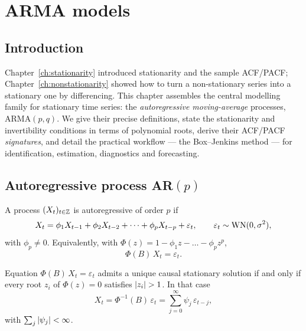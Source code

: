 
\chapter{ARMA models}
\label{ch:arma}

\section*{Introduction}

Chapter~\ref{ch:stationarity} introduced stationarity and the
sample ACF/PACF; Chapter~\ref{ch:nonstationarity} showed how to
turn a non-stationary series into a stationary one by differencing.
This chapter assembles the central modelling family for stationary
time series: the \emph{autoregressive moving-average} processes,
ARMA$(p, q)$. We give their precise definitions, state the
stationarity and invertibility conditions in terms of polynomial
roots, derive their ACF/PACF \emph{signatures}, and detail the
practical workflow --- the Box--Jenkins method --- for identification,
estimation, diagnostics and forecasting.

\section{Autoregressive process AR$(p)$}
\label{sec:ar}

\begin{defbox}
\label{def:ar}
A process $(X_t)_{t \in \mathbb{Z}}$ is autoregressive of order $p$ if
\[
  X_t = \phi_1 X_{t-1} + \phi_2 X_{t-2} + \dots + \phi_p X_{t-p}
        + \varepsilon_t,
  \qquad \varepsilon_t \sim \mathrm{WN}(0, \sigma^2),
\]
with $\phi_p \neq 0$. Equivalently, with $\Phi(z) = 1 - \phi_1 z -
\dots - \phi_p z^p$,
\[
  \Phi(B)\, X_t = \varepsilon_t.
\]
\end{defbox}

\begin{propbox}[Stationarity of AR$(p)$]
\label{prop:ar-stationary}
Equation $\Phi(B)\, X_t = \varepsilon_t$ admits a unique causal
stationary solution if and only if every root $z_i$ of
$\Phi(z) = 0$ satisfies $\left\lvert z_i \right\rvert > 1$. In that case
\[
  X_t = \Phi^{-1}(B)\, \varepsilon_t
      = \sum_{j = 0}^{\infty} \psi_j\, \varepsilon_{t-j},
\]
with $\sum_{j} \left\lvert \psi_j \right\rvert < \infty$.
\end{propbox}

